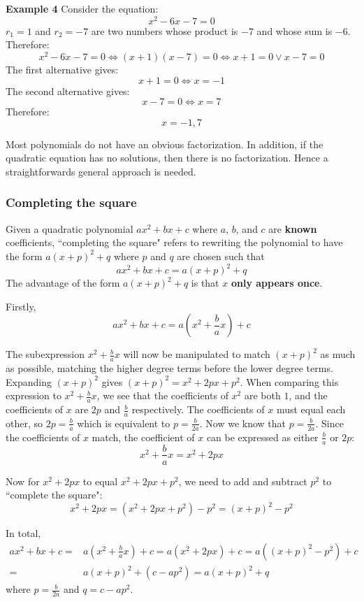 \documentclass{article}
\begin{document}
\textbf{Example 4}
Consider the equation:
\[x^2 - 6x - 7 = 0\]
\(r_1 = 1\) and \(r_2 = -7\) are two numbers whose product is \(-7\) and whose sum is \(-6\).
Therefore:
\[x^2 - 6x - 7 = 0 \iff (x + 1)(x - 7) = 0 \iff x + 1 = 0 \vee x - 7 = 0\]
The first alternative gives: 
\[x + 1 = 0 \iff x = -1\]
The second alternative gives:
\[x - 7 = 0 \iff x = 7\]
Therefore:
\[x = -1, 7\]

Most polynomials do not have an obvious factorization. In addition, if the quadratic equation has no solutions, then there is no factorization. Hence a straightforwards general approach is needed. 



\subsubsection*{Completing the square}

Given a quadratic polynomial \(ax^2 + bx + c\) where \(a\), \(b\), and \(c\) are {\bf known} coefficients, ``completing the square" refers to rewriting the polynomial to have the form \(a(x + p)^2 + q\) where \(p\) and \(q\) are chosen such that 
\[ax^2 + bx + c = a(x + p)^2 + q\]
The advantage of the form \(a(x + p)^2 + q\) is that \(x\) {\bf only appears once}. 

Firstly,
\[ax^2 + bx + c = a(x^2 + \frac{b}{a}x) + c\]

The subexpression \(x^2 + \frac{b}{a}x\) will now be manipulated to match \((x + p)^2\) as much as possible, matching the higher degree terms before the lower degree terms. Expanding \((x + p)^2\) gives \((x + p)^2 = x^2 + 2px + p^2\). When comparing this expression to \(x^2 + \frac{b}{a}x\), we see that the coefficients of \(x^2\) are both \(1\), and the coefficients of \(x\) are \(2p\) and \(\frac{b}{a}\) respectively. The coefficients of \(x\) must equal each other, so \(2p = \frac{b}{a}\) which is equivalent to \(p = \frac{b}{2a}\). Now we know that \(p = \frac{b}{2a}\). Since the coefficients of \(x\) match, the coefficient of \(x\) can be expressed as either \(\frac{b}{a}\) or \(2p\):
\[x^2 + \frac{b}{a}x = x^2 + 2px\]

Now for \(x^2 + 2px\) to equal \(x^2 + 2px + p^2\), we need to add and subtract \(p^2\) to ``complete the square": 
\[x^2 + 2px = (x^2 + 2px + p^2) - p^2 = (x + p)^2 - p^2\]

In total, 
\begin{align*}
ax^2 + bx + c
= & a(x^2 + \frac{b}{a}x) + c 
= a(x^2 + 2px) + c
= a((x + p)^2 - p^2) + c \\
= & a(x + p)^2 + (c - ap^2)
= a(x + p)^2 + q
\end{align*}
where \(p = \frac{b}{2a}\) and \(q = c - ap^2\).
\end{document}
